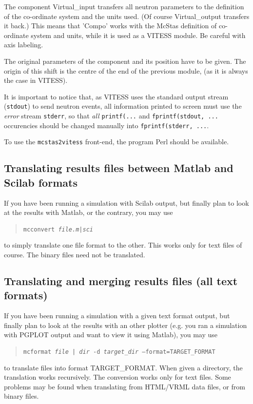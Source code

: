 The component Virtual\_input transfers all neutron parameters to the \MCS definition of the co-ordinate system and the units used. (Of course Virtual\_output transfers it back.) This means that 'Compo' works with the McStas definition of co-ordinate system and units, while it is used as a VITESS module. Be careful with axis labeling.

The original parameters of the component and its position have to be given. The origin of this shift is the centre of the end of the previous module, (as it is always the case in VITESS).

It is important to notice that, as VITESS uses the standard output stream (\verb+stdout+) to send neutron events, all information printed to screen must use the \emph{error} stream \verb+stderr+, so that \emph{all} \verb+printf(...+ and \verb+fprintf(stdout, ...+ occurencies should be changed manually into \verb+fprintf(stderr, ...+.

To use the \verb+mcstas2vitess+ front-end, the program Perl should be available.

\subsection{Translating \MCS results files between Matlab and Scilab formats}
\label{s:mcconvert}
 

If you have been running a \MCS simulation with Scilab output, but finally plan to look at the results with Matlab, or the contrary, you may use
\begin{quote}
  \texttt{mcconvert {\it file.{m|sci}\/}}
\end{quote}
to simply translate one file format to the other. This works only for text files of course. The binary files need not be translated.

\subsection{Translating and merging \MCS results files (all text formats)}
\label{s:mcformat}
    

If you have been running a \MCS simulation with a given text format output, but finally plan to look at the results with an other plotter (e.g. you ran a simulation with PGPLOT output and want to view it using Matlab), you may use
\begin{quote}
  \texttt{mcformat {\it file | dir} -d {\it target\_dir} --format=TARGET\_FORMAT}
\end{quote}
to translate files into format TARGET\_FORMAT. When given a directory, the translation works recursively. The conversion works only for text files. Some problems may be found when translating from HTML/VRML data files, or from binary files.

